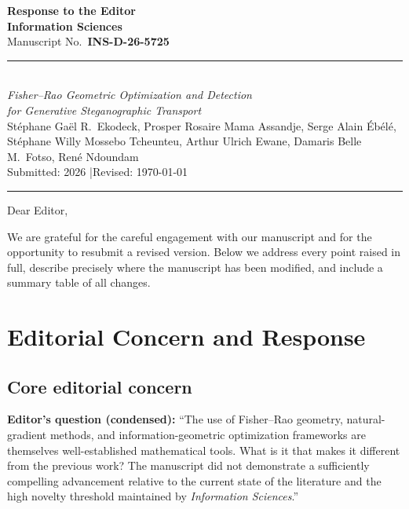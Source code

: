 \documentclass[12pt,a4paper]{article}
\begin{document}
\begin{center}
  {\LARGE\bfseries\color{editorblue} Response to the Editor}\\[8pt]
  {\large\bfseries Information Sciences}\\[4pt]
  {\large Manuscript No.\ \textbf{INS-D-26-5725}}\\[6pt]
  \rule{\linewidth}{0.8pt}\\[4pt]
  {\large\itshape Fisher--Rao Geometric Optimization and Detection\\
  for Generative Steganographic Transport}\\[6pt]
  {\normalsize
    St\'ephane Ga\"el R.\ Ekodeck,
    Prosper Rosaire Mama Assandje,
    Serge Alain \'Eb\'el\'e,\\
    St\'ephane Willy Mossebo Tcheunteu,
    Arthur Ulrich Ewane,
    Damaris Belle M.\ Fotso,
    Ren\'e Ndoundam
  }\\[4pt]
  {\small Submitted: 2026 \quad|\quad Revised: \today}
  \rule{\linewidth}{0.8pt}
\end{center}

\vspace{6pt}

Dear Editor,

We are grateful for the careful engagement with our manuscript and for
the opportunity to resubmit a revised version.
Below we address every point raised in full, describe precisely where the
manuscript has been modified, and include a summary table of all changes.

\section{Editorial Concern and Response}

\subsection{Core editorial concern}

\begin{editorbox}
\textbf{Editor's question (condensed):}
``The use of Fisher--Rao geometry, natural-gradient methods, and
information-geometric optimization frameworks are themselves well-established
mathematical tools.
What is it that makes it different from the previous work?
The manuscript did not demonstrate a sufficiently compelling advancement
relative to the current state of the literature and the high novelty
threshold maintained by \textit{Information Sciences}.''
\end{editorbox}
\end{document}
